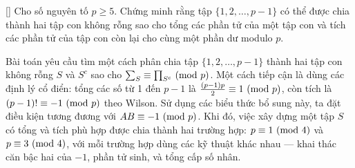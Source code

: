 \documentclass[../01-divisibility.tex]{subfiles}
\begin{document}
\begin{example*}\label{example:RUS-2015-TST-D10-P2}[\textbf{}]
	Cho số nguyên tố \( p \ge 5 \). Chứng minh rằng tập \( \{1,2,\ldots,p - 1\} \) có thể được chia thành hai tập con không rỗng
	sao cho tổng các phần tử của một tập con và tích các phần tử của tập con còn lại cho cùng một phần dư modulo \( p \).	
\end{example*}

\begin{story*}
    Bài toán yêu cầu tìm một cách phân chia tập \( \{1, 2, \dots, p-1\} \) thành hai tập con không rỗng \( S \) và \( S^c \) sao cho \( \sum_{S} \equiv \prod_{S^c} \ (\mathrm{mod}\ p) \). Một cách tiếp cận là dùng các định lý cổ điển: tổng các số từ 1 đến \( p-1 \) là \( \frac{(p-1)p}{2} \equiv 1 \ (\mathrm{mod}\ p) \), còn tích là \( (p-1)! \equiv -1 \ (\mathrm{mod}\ p) \) theo Wilson. Sử dụng các biểu thức bổ sung này, ta đặt điều kiện tương đương với \( AB \equiv -1 \ (\mathrm{mod}\ p) \). Khi đó, việc xây dựng một tập \( S \) có tổng và tích phù hợp được chia thành hai trường hợp: \( p \equiv 1 \ (\mathrm{mod}\ 4) \) và \( p \equiv 3 \ (\mathrm{mod}\ 4) \), với mỗi trường hợp dùng các kỹ thuật khác nhau — khai thác căn bậc hai của \( -1 \), phần tử sinh, và tổng cấp số nhân.
\end{story*}

\bigbreak
\end{document}
